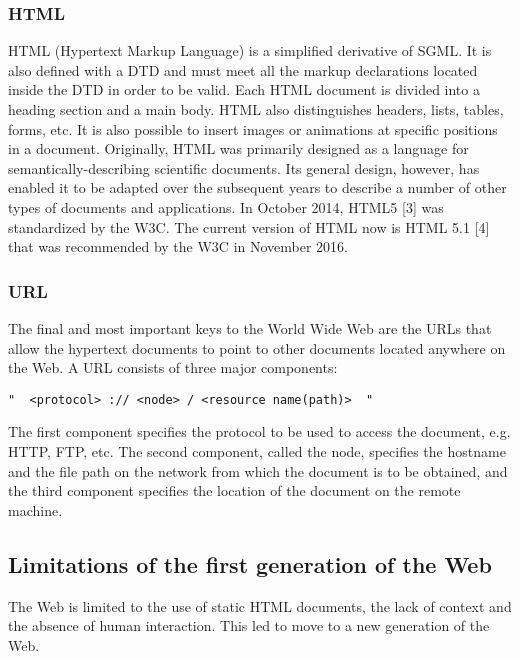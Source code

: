 \subsubsection{HTML}
\label{subsubsec_html}


HTML (Hypertext Markup Language) is a simplified derivative of SGML. It is also defined with a DTD and must meet all the markup declarations located inside the DTD in order to be valid.  Each HTML document is divided into a heading section and a main body. HTML also distinguishes headers, lists, tables, forms, etc. It is also possible to insert images or animations at specific positions in a document. 
Originally, HTML was primarily designed as a language for semantically-describing scientific documents. Its general design, however, has enabled it to be adapted over the subsequent years to describe a number of other types of documents and applications. In October 2014, HTML5 [3] was standardized by the W3C. The current version of HTML now is HTML 5.1 [4] that was recommended by the W3C in November 2016. 


\subsubsection{URL}
\label{subsubsec_url}
The final and most important keys to the World Wide Web are the URLs that allow the hypertext documents to point to other documents located anywhere on the Web. 
A URL consists of three major components: 
\begin{lstlisting}[captionpos=b, caption=URL components, label=url, belowskip=1em, aboveskip=2em,frame=single,]
	"  <protocol> :// <node> / <resource name(path)>  "
\end{lstlisting}

 The first component specifies the protocol to be used to access the document, e.g. HTTP, FTP, etc. The second component, called the node, specifies the hostname and the file path on the network from which the document is to be obtained, and the third component specifies the location of the document on the remote machine.


\subsection{Limitations of the first generation of the Web}

The Web is limited to the use of static HTML documents, the lack of context and the absence of human interaction. This led to move to a new generation of the Web.  

